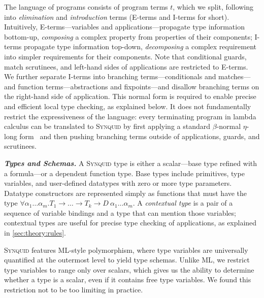 \documentclass[10pt,preprint]{sigplanconf-pldi16}
\theoremstyle{definition}
\newcommand{\custompar}[1]{\parskip 0pt \textbf{\textit{#1}}}
\newcommand{\lang}{\textsc{Synquid}\xspace}
\begin{document}
The language of programs consists of program terms $t$, 
which we split, following~\cite{OseraZd15} into \emph{elimination} and \emph{introduction} terms (E-terms and I-terms for short).
Intuitively, E-terms---variables and applications---propagate type information bottom-up,
\emph{composing} a complex property from properties of their components;
I-terms propagate type information top-down,
\emph{decomposing} a complex requirement into simpler requirements for their components.
Note that conditional guards, match scrutinees, and left-hand sides of applications are restricted to E-terms.
We further separate I-terms into branching terms---conditionals and matches---and function terms---abstractions and fixpoints---and disallow branching terms on the right-hand side of application.
This normal form is required to enable precise and efficient local type checking, as explained below.
It does not fundamentally restrict the expressiveness of the language:
every terminating program in lambda calculus can be translated to \lang
by first applying a standard $\beta$-normal $\eta$-long form~\cite{GveroKuKuPi13,OseraZd15}
and then pushing branching terms outside of applications, guards, and scrutinees.

\custompar{Types and Schemas.}
A \lang type is either a scalar---base type refined with a formula---or a dependent function type.
Base types include primitives, type variables, and user-defined datatypes with zero or more type parameters. 
Datatype constructors are represented simply as functions
that must have the type $\forall\alpha_1\ldots\alpha_m.T_1\to\ldots\to T_k\to D\ \alpha_1\ldots\alpha_m$.
A \emph{contextual type} is a pair of a sequence of variable bindings and a type that can mention those variables;
contextual types are useful for precise type checking of applications, as explained in \autoref{sec:theory:rules}.

\lang features ML-style polymorphism, where type variables are universally quantified at the outermost level to yield type schemas.
Unlike ML, we restrict type variables to range only over scalars,
which gives us the ability to determine whether a type is a scalar, even if it contains free type variables.
We found this restriction not to be too limiting in practice.
\end{document}
